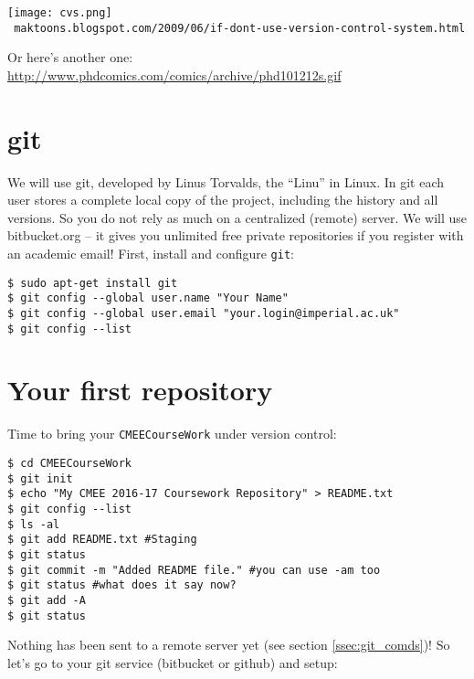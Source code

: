 {\centering  \texttt{[image: cvs.png]}\\
  \tt 
maktoons.blogspot.com/2009/06/if-dont-use-version-control-system.html}
 
 Or here's another one: \url{http://www.phdcomics.com/comics/archive/phd101212s.gif} 
  
\section{git}

We will use git, developed by Linus Torvalds, the ``Linu'' in Linux. In 
git each user stores a complete local copy of the project, including the 
history and all versions. So you do not rely as much on a centralized 
(remote) server. We will use bitbucket.org -- it gives you unlimited 
free private repositories if you register with an academic email! 
First, install and configure {\tt git}:

\begin{lstlisting} 
$ sudo apt-get install git
$ git config --global user.name "Your Name"
$ git config --global user.email "your.login@imperial.ac.uk"
$ git config --list
\end{lstlisting}

\section{Your first repository}

Time to bring your {\tt CMEECourseWork} under version control:

\begin{lstlisting} 
$ cd CMEECourseWork
$ git init
$ echo "My CMEE 2016-17 Coursework Repository" > README.txt
$ git config --list
$ ls -al
$ git add README.txt #Staging
$ git status
$ git commit -m "Added README file." #you can use -am too
$ git status #what does it say now?
$ git add -A
$ git status
\end{lstlisting} 

Nothing has been sent to a remote server yet (see section 
\ref{ssec:git_comds})! So let's go to your git service (bitbucket or 
github) and setup:

